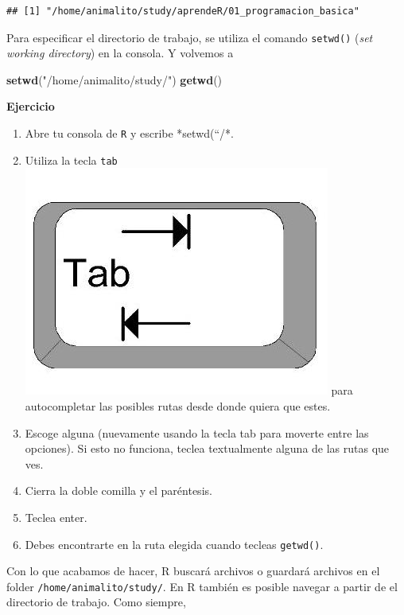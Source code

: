 \documentclass[]{article}
\newenvironment{Shaded}{\begin{snugshade}}{\end{snugshade}}
\newcommand{\KeywordTok}[1]{\textcolor[rgb]{0.13,0.29,0.53}{\textbf{{#1}}}}
\newcommand{\StringTok}[1]{\textcolor[rgb]{0.31,0.60,0.02}{{#1}}}
\newcommand{\NormalTok}[1]{{#1}}
\begin{document}
\begin{verbatim}
## [1] "/home/animalito/study/aprendeR/01_programacion_basica"
\end{verbatim}

Para especificar el directorio de trabajo, se utiliza el comando
\texttt{setwd()} (\emph{set working directory}) en la consola. Y
volvemos a

\begin{Shaded}
\begin{Highlighting}[]
\KeywordTok{setwd}\NormalTok{(}\StringTok{"/home/animalito/study/"}\NormalTok{)}
\KeywordTok{getwd}\NormalTok{()}
\end{Highlighting}
\end{Shaded}

\textbf{Ejercicio}

\begin{enumerate}
\def\labelenumi{\arabic{enumi}.}
\itemsep1pt\parskip0pt
\item
  Abre tu consola de \texttt{R} y escribe *setwd(``/*.
\item
  Utiliza la tecla \texttt{tab}
  \includegraphics[scale=0.5]{../img/tab_key.jpg} para autocompletar las
  posibles rutas desde donde quiera que estes.
\item
  Escoge alguna (nuevamente usando la tecla tab para moverte entre las
  opciones). Si esto no funciona, teclea textualmente alguna de las
  rutas que ves.
\item
  Cierra la doble comilla y el paréntesis.
\item
  Teclea enter.
\item
  Debes encontrarte en la ruta elegida cuando tecleas \texttt{getwd()}.
\end{enumerate}

Con lo que acabamos de hacer, R buscará archivos o guardará archivos en
el folder \texttt{/home/animalito/study/}. En R también es posible
navegar a partir de el directorio de trabajo. Como siempre,
\end{document}
